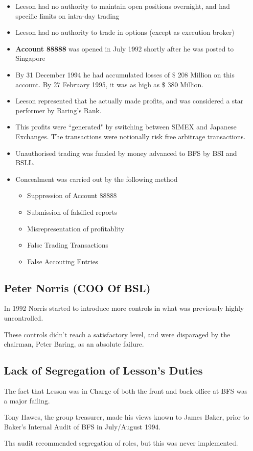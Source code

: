 \documentclass[PRMIA4A.tex]{subfiles}
\begin{document}
\begin{itemize}
\item Leeson had no authority to maintain open positions overnight, and had specific limits on intra-day trading
\item Leeson had no authority to trade in options (except as execution broker)

\item \textbf{Account 88888} was opened in July 1992 shortly after he was posted to Singapore

\item By 31 December 1994 he had accumulated losses of $\$$ 208 Million on this account. By 27 February 1995, it was as high as $\$$ 380 Million.

\item Leeson represented that he actually made profits, and was considered a star performer by Baring's Bank.
\item This profits were ``generated" by switching between SIMEX and Japanese Exchanges. The transactions were notionally risk free arbitrage transactions.
\item Unauthorised trading was funded by money advanced to BFS by BSI and BSLL.

\item Concealment was carried out by the following method
\begin{itemize}
\item Suppression of Account 88888 
\item Submission of falsified reports
\item Misrepresentation of profitablity
\item False Trading Transactions
\item False Accouting Entries
\end{itemize}
\end{itemize}
\subsection{Peter Norris (COO Of BSL) }

In 1992 Norris started to introduce more controls in what was previously highly uncontrolled.

These controls didn't reach a satisfactory level, and were disparaged by the chairman, Peter Baring, as an absolute failure.

\subsection{ Lack of Segregation of Lesson's Duties}

The fact that Lesson was in Charge of both the front and back office at BFS was a major failing.

Tony Hawes, the group treasurer, made his views known to James Baker, prior to Baker's Internal Audit of BFS in July/August 1994.

Ths audit recommended segregation of roles, but this was never implemented.
\end{document}
